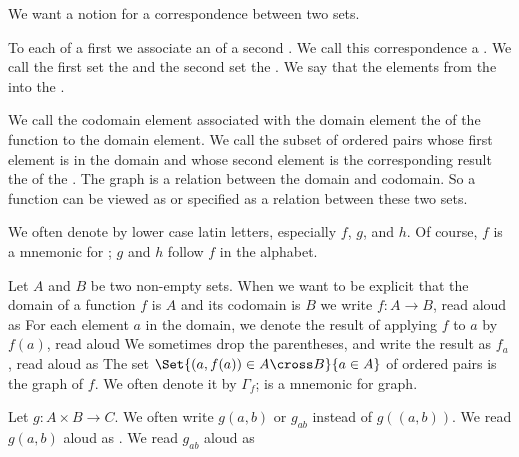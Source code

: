 
\sbasic




\sstart


We want a notion for a correspondence between two sets.


To each  of a first  we associate an  of a second .
We call this correspondence a .
We call the first set the  and the second set the .
We say that the   elements from the  into the .

We call the codomain element associated with the domain element the  of  the function to the domain element.
We call the subset of ordered pairs whose first element is in the domain and whose second element is the corresponding result the  of the .
The graph is a relation between the domain and codomain.
So a function can be viewed as or specified as a relation between these two sets.

We often denote  by lower case latin letters, especially $f$, $g$, and $h$.
Of course, $f$ is a mnemonic for ; $g$ and $h$ follow $f$ in the alphabet.

Let $A$ and $B$ be two non-empty sets.
When we want to be explicit that the domain of a function $f$ is $A$ and its codomain is $B$ we write $f: A \to B$, read aloud as 
For each element $a$ in the domain, we denote the result of applying $f$ to $a$ by $f(a)$, read aloud 
We sometimes drop the parentheses, and write the result as $f_a$, read aloud as 
The set $\Set{(a, f(a)) \in A \cross B}{a \in A}$ of ordered pairs is the graph of $f$.
We often denote it by $\Gamma_f$;  is a mnemonic for graph.

Let $g: A \times B \to C$.
We often write $g(a,b)$ or $g_{ab}$ instead of $g((a,b))$. We read $g(a, b)$ aloud as .
We read $g_{ab}$ aloud as 


